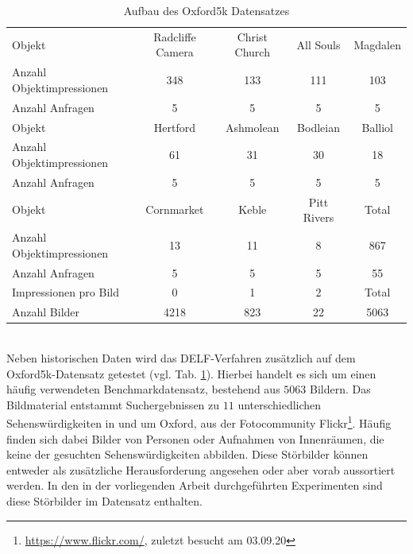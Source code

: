 \begin{table}[h]
\centering
\begin{tabular}{l|c|c|c|c}
\rowcolor[HTML]{C0C0C0} 
Objekt                 & Radcliffe Camera & Christ Church & All Souls   & Magdalen \\
Anzahl Objektimpressionen & 348              & 133           & 111         & 103      \\
Anzahl Anfragen           & 5                & 5             & 5           & 5        \\ \hline
\rowcolor[HTML]{C0C0C0} 
Objekt                & Hertford         & Ashmolean     & Bodleian    & Balliol  \\
Anzahl Objektimpressionen & 61               & 31            & 30          & 18       \\
Anzahl Anfragen           & 5                & 5             & 5           & 5        \\ \hline
\rowcolor[HTML]{C0C0C0} 
Objekt                 & Cornmarket       & Keble         & Pitt Rivers & Total    \\
Anzahl Objektimpressionen & 13               & 11            & 8           & 867      \\
Anzahl Anfragen           & 5                & 5             & 5           & 55       \\ \hline
\rowcolor[HTML]{C0C0C0} 
Impressionen pro Bild     & 0                & 1             & 2           & Total    \\
Anzahl Bilder             & 4218             & 823           & 22          & 5063    
\end{tabular}%
\caption{Aufbau des Oxford5k Datensatzes}
\label{oxford5k_data}
\end{table}
\\
Neben historischen Daten wird das DELF-Verfahren zusätzlich auf dem Oxford5k-Datensatz \cite{oxford5k} getestet (vgl. Tab. \ref{oxford5k_data}). Hierbei handelt es sich um einen häufig verwendeten Benchmarkdatensatz, bestehend aus $5063$ Bildern. Das Bildmaterial entstammt Suchergebnissen zu $11$ unterschiedlichen Sehenswürdigkeiten in und um Oxford, aus der Fotocommunity Flickr\footnote{\url{https://www.flickr.com/}, zuletzt besucht am 03.09.20}. Häufig finden sich dabei Bilder von Personen oder Aufnahmen von Innenräumen, die keine der gesuchten Sehenswürdigkeiten abbilden. Diese Störbilder können entweder als zusätzliche Herausforderung angesehen oder aber vorab aussortiert werden. In den in der vorliegenden Arbeit durchgeführten Experimenten sind diese Störbilder im Datensatz enthalten. 


